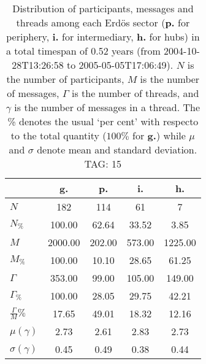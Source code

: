 \begin{table}[h!]
\begin{center}
\begin{tabular}{| l || c | c | c | c |}\hline
 & {\bf g.} & {\bf p.} & {\bf i.} & {\bf h.} \\\hline\hline
$N$ & 182  & 114  & 61  & 7 \\
$N_{\%}$ & 100.00  & 62.64  & 33.52  & 3.85 \\\hline
$M$ & 2000.00  & 202.00  & 573.00  & 1225.00 \\
$M_{\%}$ & 100.00  & 10.10  & 28.65  & 61.25 \\\hline
$\Gamma$ & 353.00  & 99.00  & 105.00  & 149.00 \\
$\Gamma_{\%}$ & 100.00  & 28.05  & 29.75  & 42.21 \\\hline
$\frac{\Gamma}{M}\%$ & 17.65  & 49.01  & 18.32  & 12.16 \\
$\mu(\gamma)$ & 2.73  & 2.61  & 2.83  & 2.73 \\
$\sigma(\gamma)$ & 0.45  & 0.49  & 0.38  & 0.44 \\\hline
\end{tabular}
\caption{Distribution of participants, messages and threads among each Erd\"os sector ({\bf p.} for periphery, {\bf i.} for intermediary, 
    {\bf h.} for hubs) in a total timespan of 0.52 years (from 2004-10-28T13:26:58 to 2005-05-05T17:06:49). $N$ is the number of participants, $M$ is the number of messages, $\Gamma$ is the number of threads, and $\gamma$ is the number of messages in a thread.
    The \% denotes the usual `per cent' with respecto to the total quantity ($100\%$ for {\bf g.})
    while $\mu$ and $\sigma$ denote mean and standard deviation. TAG: 15}
\end{center}
\end{table}